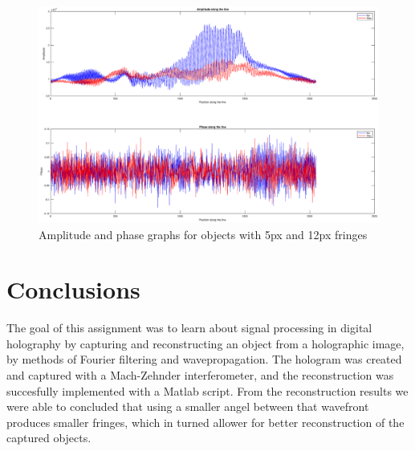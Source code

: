 \documentclass[12pt,a4paper,english
]{tunithesis}
\begin{document}
\begin{figure}
  \centering
  \includegraphics[width=\columnwidth]{img/lines.eps}
  \caption{Amplitude and phase graphs for objects with 5px and 12px fringes}
  \label{fig:lines}
\end{figure}



\chapter{Conclusions}
\label{ch:conclusions}
The goal of this assignment was to learn about signal processing in digital holography by capturing and reconstructing an object from a holographic image, by methods of Fourier filtering and wavepropagation. The hologram was created and captured with a Mach-Zehnder interferometer, and the reconstruction was succesfully implemented with a Matlab script.
From the reconstruction results we were able to concluded that using a smaller angel between that wavefront produces smaller fringes, which in turned allower for better reconstruction of the captured objects.


%
%
\newpage

\printbibliography[title=References]
\appendix
\pagestyle{headings}

%
%
\def\appA{APPENDIX} %
\end{document}
